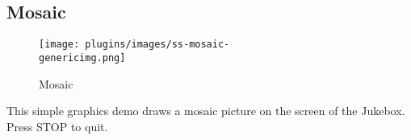 \subsection{Mosaic}
\begin{figure}[h!]
\begin{center}
\texttt{[image: plugins/images/ss-mosaic-\\genericimg.png]}
\end{center}
\caption{Mosaic}
\end{figure}

This simple graphics demo draws a mosaic picture on the screen of the
Jukebox.  Press STOP to quit.
